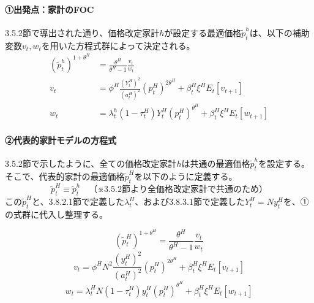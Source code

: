 \paragraph{①出発点：家計のFOC}\label{sec:chapter3_final_equations_pricing_dynamics_origin}
3.5.2節で導出された通り、価格改定家計\(h\)が設定する最適価格\(\widetilde{p}_t^h\)は、以下の補助変数\(v_t,w_t\)を用いた方程式群によって決定される。
\begin{align}
(\widetilde{p}_t^h)^{1+\theta^H}&=\frac{\theta^H}{\theta^H-1}\frac{v_t}{w_t} \label{form:model_final_equations_pricing_opt_p_restated} \\
v_t&=\phi^H\frac{(Y_t^H)^2}{(a_t^H)^2}(p_t^H)^{2\theta^H}+\beta_t^H\xi^HE_t[v_{t+1}] \label{form:model_final_equations_pricing_v_restated} \\
w_t&=\lambda_t^h(1-\tau_t^H)Y_t^H(p_t^H)^{\theta^H}+\beta_t^H\xi^HE_t[w_{t+1}] \label{form:model_final_equations_pricing_w_restated}
\end{align}

\paragraph{②代表的家計モデルの方程式}\label{sec:chapter3_final_equations_pricing_dynamics_ra_eq}
3.5.2節で示したように、全ての価格改定家計\(h\)は共通の最適価格\(\widetilde{p}_t^h\)を設定する。そこで、代表的家計の最適価格\(\widetilde{p}_t^H\)を以下のように定義する。
\begin{equation}
\widetilde{p}_t^H\equiv\widetilde{p}_t^h\quad（※3.5.2節より全価格改定家計で共通のため）
\label{form:model_final_equations_pricing_ra_opt_p_def}
\end{equation}
この\(\widetilde{p}_t^H\)と、3.8.2.1節で定義した\(\lambda_t^H\)、および3.8.3.1節で定義した\(Y_t^H=Ny_t^H\)を、①の式群に代入し整理する。



\begin{equation}
(\widetilde{p}_t^H)^{1+\theta^H}=\frac{\theta^H}{\theta^H-1}\frac{v_t}{w_t}
\label{form:model_final_equations_pricing_opt_p_h}
\end{equation}
\begin{equation}
v_t=\phi^HN^2\frac{(y_t^H)^2}{(a_t^H)^2}(p_t^H)^{2\theta^H}+\beta_t^H\xi^HE_t[v_{t+1}]
\label{form:model_final_equations_pricing_v_h}
\end{equation}
\begin{equation}
w_t=\lambda_t^HN(1-\tau_t^H)y_t^H(p_t^H)^{\theta^H}+\beta_t^H\xi^HE_t[w_{t+1}]
\label{form:model_final_equations_pricing_w_h}
\end{equation}

